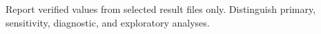 Report verified values from selected result files only. Distinguish primary, sensitivity, diagnostic, and exploratory analyses.


